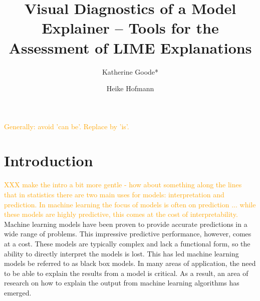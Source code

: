 \documentclass[AMS,STIX2COL]{WileyNJD-v2}
\newcommand{\hh}[1]{\textcolor{orange}{#1}}
\begin{document}


\title{Visual Diagnostics of a Model Explainer -- Tools for the Assessment of LIME Explanations}

\author[1]{Katherine Goode*}

\author[1,2]{Heike Hofmann}


\address[1]{, , }

\address[2]{, , }






\maketitle

\hh{Generally: avoid 'can be'. Replace by 'is'.  }

\section{Introduction}

\hh{XXX make the intro a bit more gentle - how about something along the lines that in statistics there are two main uses for models: interpretation and prediction. In machine learning the focus of models is often on prediction ... while these models are highly predictive, this comes at the cost of interpretability.}
Machine learning models have been proven to provide accurate predictions in a wide range of problems. This impressive predictive performance, however, comes at a cost. These models are typically complex and lack a functional form, so the ability to directly interpret the models is lost. This has led machine learning models be referred to as black box models. In many areas of application, the need to be able to explain the results from a model is critical. As a result, an area of research on how to explain the output from machine learning algorithms has emerged.
\end{document}
